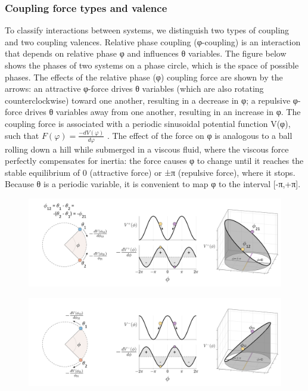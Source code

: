 \subsubsection{Coupling force types and valence} 

To classify interactions between systems, we distinguish two types of coupling and two coupling valences. Relative phase coupling (φ-coupling) is an interaction that depends on relative phase φ and influences θ variables. The figure below shows the phases of two systems on a phase circle, which is the space of possible phases. The effects of the relative phase (φ) coupling force are shown by the arrows: an attractive φ-force drives θ variables (which are also rotating counterclockwise) toward one another, resulting in a decrease in φ; a repulsive φ-force drives θ variables away from one another, resulting in an increase in φ. The coupling force is associated with a periodic sinusoidal potential function V(φ), such that  $F\left(\varphi \right)=\frac{-\mathit{dV}\left(\varphi \right)}{\mathit{d\varphi} }$ . The effect of the force on φ is analogous to a ball rolling down a hill while submerged in a viscous fluid, where the viscous force perfectly compensates for inertia: the force causes φ to change until it reaches the stable equilibrium of 0 (attractive force) or ±π (repulsive force), where it stops. Because θ is a periodic variable, it is convenient to map φ to the interval [-π,+π]. 

  
\begin{figure}
\includegraphics[width=\textwidth]{figures/Tilsen-img18.png}
\caption{\missingcaption}
\label{fig:}
\end{figure}
 

  
\begin{figure}
\includegraphics[width=\textwidth]{figures/Tilsen-img19.png}
\caption{\missingcaption}
\label{fig:}
\end{figure}
 

